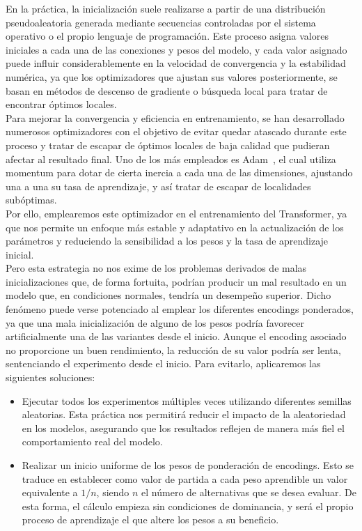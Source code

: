 En la práctica, la inicialización suele realizarse a partir de una distribución pseudoaleatoria generada mediante secuencias controladas por el sistema operativo o el propio lenguaje de programación. Este proceso asigna valores iniciales a cada una de las conexiones y pesos del modelo, y cada valor asignado puede influir considerablemente en la velocidad de convergencia y la estabilidad numérica, ya que los optimizadores que ajustan sus valores posteriormente, se basan en métodos de descenso de gradiente o búsqueda local para tratar de encontrar óptimos locales.\\

Para mejorar la convergencia y eficiencia en entrenamiento, se han desarrollado numerosos optimizadores con el objetivo de evitar quedar atascado durante este proceso y tratar de escapar de óptimos locales de baja calidad que pudieran afectar al resultado final. Uno de los más empleados es Adam~\cite{kingma2017adammethodstochasticoptimization}, el cual utiliza momentum para dotar de cierta inercia a cada una de las dimensiones, ajustando una a una su tasa de aprendizaje, y así tratar de escapar de localidades subóptimas.\\

Por ello, emplearemos este optimizador en el entrenamiento del Transformer, ya que nos permite un enfoque más estable y adaptativo en la actualización de los parámetros y reduciendo la sensibilidad a los pesos y la tasa de aprendizaje inicial.\\
 
Pero esta estrategia no nos exime de los problemas derivados de malas inicializaciones que, de forma fortuita, podrían producir un mal resultado en un modelo que, en condiciones normales, tendría un desempeño superior. Dicho fenómeno puede verse potenciado al emplear los diferentes encodings ponderados, ya que una mala inicialización de alguno de los pesos podría favorecer artificialmente una de las variantes desde el inicio. Aunque el encoding asociado no proporcione un buen rendimiento, la reducción de su valor podría ser lenta, sentenciando el experimento desde el inicio. Para evitarlo, aplicaremos las siguientes soluciones:

\begin{itemize}
	\item Ejecutar todos los experimentos múltiples veces utilizando diferentes semillas aleatorias. Esta práctica nos permitirá reducir el impacto de la aleatoriedad en los modelos, asegurando que los resultados reflejen de manera más fiel el comportamiento real del modelo.
	\item Realizar un inicio uniforme de los pesos de ponderación de encodings. Esto se traduce en establecer como valor de partida a cada peso aprendible un valor equivalente a $1/n$, siendo $n$ el número de alternativas que se desea evaluar. De esta forma, el cálculo empieza sin condiciones de dominancia, y será el propio proceso de aprendizaje el que altere los pesos a su beneficio.
\end{itemize}

